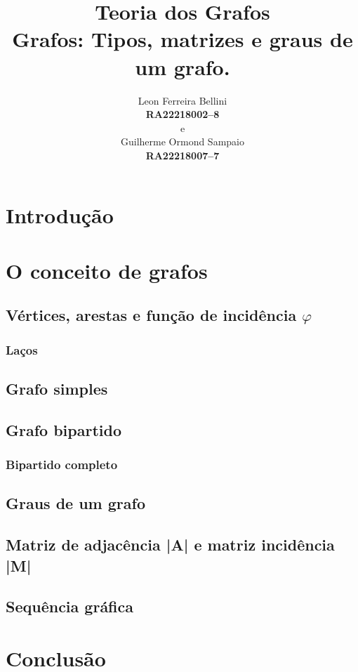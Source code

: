 \documentclass[a4paper, 12pt]{article}
\begin{document}
\title{\textbf{Teoria dos Grafos}\\ \small{Grafos: Tipos, matrizes e graus de um grafo.}}
\author{Leon Ferreira Bellini\\
	\small{\textbf{RA\@ 22218002--8}}\\
	e\\
   Guilherme Ormond Sampaio\\
   \small{\textbf{RA\@ 22218007--7}}
}
\date{}
\maketitle
\section{Introdução}
\section{O conceito de grafos}
\subsection{Vértices, arestas e função de incidência {$\varphi$}}
\subsubsection{Laços}
\subsection{Grafo simples}
\subsection{Grafo bipartido}
\subsubsection{Bipartido completo}
\subsection{Graus de um grafo}
\subsection{Matriz de adjacência |A| e matriz incidência |M| }
\subsection{Sequência gráfica}
\section{Conclusão}
\end{document}
